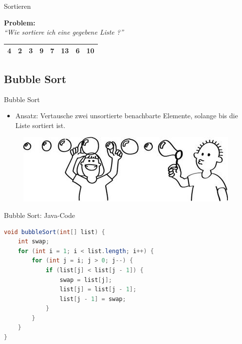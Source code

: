 \documentclass[18pt]{beamer}
\newcommand{\quotes}[1]{``#1''}
\begin{document}
\begin{frame}{Sortieren}
    \begin{block}{}
        \textbf{Problem:}\\
        \textit{\quotes{Wie sortiere ich eine gegebene Liste ?}}
    \end{block}
    \vspace{.2in}
    \begin{center}
        \begin{tabular}{|c|c|c|c|c|c|c|c|}
            \hline
            4 & 2 & 3 & 9 & 7 & 13 & 6 & 10 \\
            \hline
        \end{tabular}
    \end{center}
\end{frame}

\subsection{Bubble Sort}

\begin{frame}{Bubble Sort}
    \begin{itemize}
        \item Ansatz: Vertausche zwei unsortierte benachbarte Elemente, solange bis die Liste sortiert ist.
    \end{itemize}
    \vspace{.2in}
    \begin{figure}
        \includegraphics[scale=.5]{img/BubbleSort.jpg}
    \end{figure}
\end{frame}

\begin{frame}[fragile]{Bubble Sort: Java-Code}
    \begin{exampleblock}{}
        \begin{lstlisting}[language=Java,basicstyle=\scriptsize]
void bubbleSort(int[] list) {
    int swap;
    for (int i = 1; i < list.length; i++) {
        for (int j = i; j > 0; j--) {
            if (list[j] < list[j - 1]) {
                swap = list[j];
                list[j] = list[j - 1];
                list[j - 1] = swap;
            }
        }
    }
}
        \end{lstlisting}
    \end{exampleblock}
\end{frame}
\end{document}
